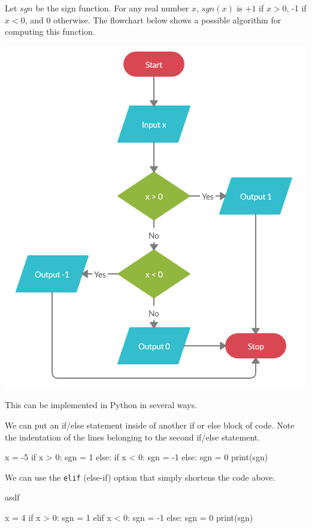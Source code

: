 \documentclass{ximera}
\begin{document}
Let $sgn$ be the sign function. For any real number $x$, $sgn(x)$ is $+1$ if $x>0$, -1 if $x<0$, and $0$ otherwise. The flowchart below shows a possible algorithm for computing this function.

\begin{center}
	\includegraphics{signfun.png}
\end{center}

This can be implemented in Python in several ways. 

We can put an if/else statement inside of another if or else block of code. Note the indentation of the lines belonging to the second if/else statement.

\begin{sageCell}
x = -5
if x > 0:
	sgn = 1
else:
	if x < 0:
		sgn = -1
	else:
		sgn = 0
print(sgn)
\end{sageCell}
	
We can use the \verb|elif| (else-if) option that simply shortens the code above.

asdf

\begin{sageCell}
x = 4
if x > 0:
        sgn = 1
elif x < 0:
        sgn = -1
else:
        sgn = 0
print(sgn)
\end{sageCell}
\end{document}
